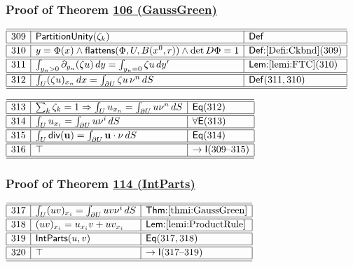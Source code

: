 \documentclass[11pt,reqno]{amsart}
\begin{document}
\medskip

\subsubsection*{Proof of Theorem \hyperlink{thm:GaussGreen}{106 (\textsf{GaussGreen})}}

\noindent$%
\begin{array}{|r|l|l|}
\hline\hline
309 & \mathsf{PartitionUnity}(\zeta_{k}) & \mathsf{Def} \\ \hline\hline
310 & y=\Phi(x)\wedge\mathsf{flattens}(\Phi,U,B(x^{0},r))\wedge\det D\Phi=1 & \textsf{Def:}\ref{Defi:Ckbnd}(309) \\ \hline\hline
311 & \int_{y_{n}>0}\partial_{y_{n}}(\zeta u)\,dy=\int_{y_{n}=0}\zeta u\,dy^{\prime } & \textsf{Lem:}\ref{lemi:FTC}(310) \\ \hline\hline
312 & \int_{U}(\zeta u)_{x_{n}}\,dx=\int_{\partial U}\zeta u\,\nu^{n}\,dS & \mathsf{Def}(311,310) \\ \hline\hline
\end{array}%
$

\medskip

\noindent$%
\begin{array}{|r|l|l|}
\hline\hline
313 & \sum_{k}\zeta_{k}=1\Rightarrow\int_{U}u_{x_{n}}=\int_{\partial U}u\nu^{n}\,dS & \mathsf{Eq}(312) \\ \hline\hline
314 & \int_{U}u_{x_{i}}=\int_{\partial U}u\nu^{i}\,dS & \forall\mathsf{E}(313) \\ \hline\hline
315 & \int_{U}\mathsf{div}(\mathbf{u})=\int_{\partial U}\mathbf{u}\cdot\nu\,dS & \mathsf{Eq}(314) \\ \hline\hline
316 & \top & \to\mathsf{I}(309\text{--}315) \\ \hline\hline
\end{array}%
$

\medskip

\subsubsection*{Proof of Theorem \hyperlink{thm:IntParts}{114 (\textsf{IntParts})}}

\noindent$%
\begin{array}{|r|l|l|}
\hline\hline
317 & \int_{U}(uv)_{x_{i}}=\int_{\partial U}uv\nu^{i}\,dS & \textsf{Thm:}\ref{thmi:GaussGreen} \\ \hline\hline
318 & (uv)_{x_{i}}=u_{x_{i}}v+uv_{x_{i}} & \textsf{Lem:}\ref{lemi:ProductRule} \\ \hline\hline
319 & \mathsf{IntParts}(u,v) & \mathsf{Eq}(317,318) \\ \hline\hline
320 & \top & \to\mathsf{I}(317\text{--}319) \\ \hline\hline
\end{array}%
$
\end{document}

